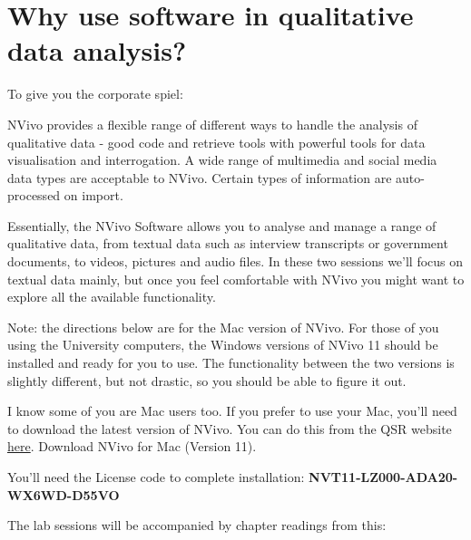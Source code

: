\documentclass[]{book}
\theoremstyle{definition}
\theoremstyle{definition}
\theoremstyle{definition}
\theoremstyle{remark}
\begin{document}
\hypertarget{why-use-software-in-qualitative-data-analysis}{%
\section{Why use software in qualitative data
analysis?}\label{why-use-software-in-qualitative-data-analysis}}

To give you the corporate spiel:

NVivo provides a flexible range of different ways to handle the analysis
of qualitative data - good code and retrieve tools with powerful tools
for data visualisation and interrogation. A wide range of multimedia and
social media data types are acceptable to NVivo. Certain types of
information are auto-processed on import.

Essentially, the NVivo Software allows you to analyse and manage a range
of qualitative data, from textual data such as interview transcripts or
government documents, to videos, pictures and audio files. In these two
sessions we'll focus on textual data mainly, but once you feel
comfortable with NVivo you might want to explore all the available
functionality.

Note: the directions below are for the Mac version of NVivo. For those
of you using the University computers, the Windows versions of NVivo 11
should be installed and ready for you to use. The functionality between
the two versions is slightly different, but not drastic, so you should
be able to figure it out.

I know some of you are Mac users too. If you prefer to use your Mac,
you'll need to download the latest version of NVivo. You can do this
from the QSR website
\href{http://www.qsrinternational.com/nvivo/support-overview/downloads}{here}.
Download NVivo for Mac (Version 11).

You'll need the License code to complete installation:
\textbf{NVT11-LZ000-ADA20-WX6WD-D55VO}

The lab sessions will be accompanied by chapter readings from this:
\end{document}
